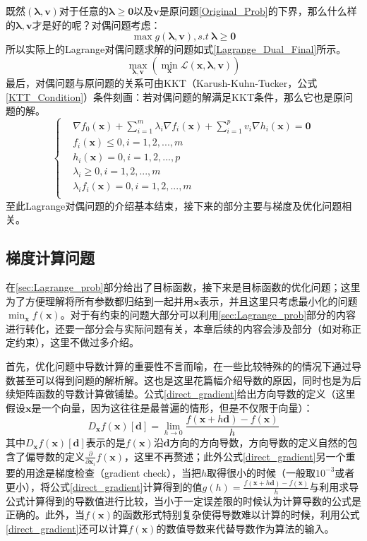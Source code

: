 既然$(\bm{\lambda},\bm{v})$对于任意的$\bm{\lambda} \geq \bm{0}$以及$\bm{v}$是原问题\ref{Original_Prob}的下界，那么什么样的$\bm{\lambda},\bm{v}$才是好的呢？对偶问题考虑：
\begin{equation}
\label{Dual_Prob}
\max g(\bm{\lambda},\bm{v}),s.t~\bm{\lambda} \geq \bm{0}
\end{equation}
所以实际上的Lagrange对偶问题求解的问题如式\ref{Lagrange_Dual_Final}所示。
\begin{equation}
\label{Lagrange_Dual_Final}
\max_{\bm{\lambda},\bm{v}}\left(\min_{\bm{x}}\mathcal{L}(\bm{x},\bm{\lambda},\bm{v})\right)
\end{equation}
最后，对偶问题与原问题的关系可由KKT（Karush-Kuhn-Tucker，公式\ref{KTT_Condition}）条件刻画：若对偶问题的解满足KKT条件，那么它也是原问题的解。
\begin{equation}
\label{KTT_Condition}
\left\{
\begin{aligned}
&\nabla f_0(\bm{x})+\sum_{i=1}^{m}\lambda_i \nabla f_i(\bm{x})+\sum_{i=1}^{p}v_i \nabla h_i(\bm{x})=\bm{0}\\
&f_i(\bm{x}) \leq 0,i=1,2,...,m\\
&h_i(\bm{x}) =0,i=1,2,...,p\\
&\lambda_i \geq 0,i=1,2,...,m\\
&\lambda_i f_i(\bm{x})=0, i=1,2,...,m\\
\end{aligned}
\right.
\end{equation}
至此Lagrange对偶问题的介绍基本结束，接下来的部分主要与梯度及优化问题相关。
\subsection{梯度计算问题}
\label{sec:gradinet}
在\ref{sec:Lagrange_prob}部分给出了目标函数，接下来是目标函数的优化问题；这里为了方便理解将所有参数都归结到一起并用$\bm{x}$表示，并且这里只考虑最小化的问题$\min_{\bm{x}} f(\bm{x})$。对于有约束的问题大部分可以利用\ref{sec:Lagrange_prob}部分的内容进行转化，还要一部分会与实际问题有关，本章后续的内容会涉及部分（如对称正定约束），这里不做过多介绍。

首先，优化问题中导数计算的重要性不言而喻，在一些比较特殊的的情况下通过导数甚至可以得到问题的解析解。这也是这里花篇幅介绍导数的原因，同时也是为后续矩阵函数的导数计算做铺垫。公式\ref{direct_gradient}给出方向导数的定义（这里假设$\bm{x}$是一个向量，因为这往往是最普遍的情形，但是不仅限于向量）：
\begin{equation}
\label{direct_gradient}
D_{\bm{x}}f(\bm{x})[\bm{d}]=\lim_{h\rightarrow 0}\frac{f(\bm{x}+h\bm{d})-f(\bm{x})}{h}
\end{equation}
其中$D_{\bm{x}}f(\bm{x})[\bm{d}]$表示的是$f(\bm{x})$沿$\bm{d}$方向的方向导数，方向导数的定义自然的包含了偏导数的定义$\frac{\partial}{\partial \bm{x}_{i}}f(\bm{x})$，这里不再赘述；此外公式\ref{direct_gradient}另一个重要的用途是梯度检查（gradient check），当把$h$取得很小的时候（一般取$10^{-3}$或者更小），将公式\ref{direct_gradient}计算得到的值$g(h)=\frac{f(\bm{x}+h\bm{d})-f(\bm{x})}{h}$与利用求导公式计算得到的导数值进行比较，当小于一定误差限的时候认为计算导数的公式是正确的。此外，当$f(\bm{x})$的函数形式特别复杂使得导数难以计算的时候，利用公式\ref{direct_gradient}还可以计算$f(\bm{x})$的数值导数来代替导数作为算法的输入。

